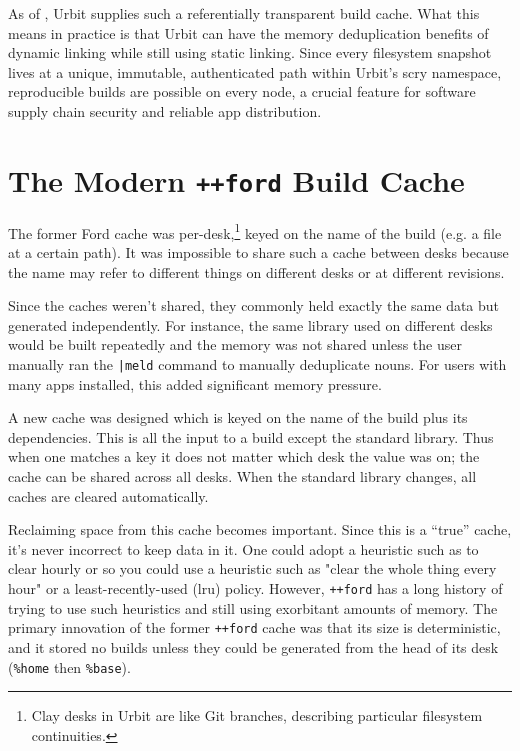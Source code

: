 \documentclass[twoside]{article}
\begin{document}
As of , Urbit supplies such a referentially transparent build cache.  What this means in practice is that Urbit can have the memory deduplication benefits of dynamic linking while still using static linking.  Since every filesystem snapshot lives at a unique, immutable, authenticated path within Urbit's scry namespace, reproducible builds are possible on every node, a crucial feature for software supply chain security and reliable app distribution.

\section{The Modern \lstinline[style=inlinecode]{++ford} Build Cache}

\sloppy
The former Ford cache was per-desk,\footnote{Clay desks in Urbit are like Git branches, describing particular filesystem continuities.} keyed on the name of the build (e.g. a file at a certain path).  It was impossible to share such a cache between desks because the name may refer to different things on different desks or at different revisions.

Since the caches weren't shared, they commonly held exactly the same data but generated independently.  For instance, the same library used on different desks would be built repeatedly and the memory was not shared unless the user manually ran the \lstinline[style=inlinecode]{|meld} command to manually deduplicate nouns.  For users with many apps installed, this added significant memory pressure.

A new cache was designed which is keyed on the name of the build plus its dependencies. This is all the input to a build except the standard library.  Thus when one matches a key it does not matter which desk the value was on; the cache can be shared across all desks.  When the standard library changes, all caches are cleared automatically.

Reclaiming space from this cache becomes important.  Since this is a “true” cache, it's never incorrect to keep data in it.  One could adopt a heuristic such as to clear hourly or so you could use a heuristic such as "clear the whole thing every hour" or a least-recently-used ({\sc lru}) policy.  However, \lstinline[style=inlinecode]{++ford} has a long history of trying to use such heuristics and still using exorbitant amounts of memory.  The primary innovation of the former \lstinline[style=inlinecode]{++ford} cache was that its size is deterministic, and it stored no builds unless they could be generated from the head of its desk (\lstinline[style=inlinecode]{%home} then \lstinline[style=inlinecode]{%base}).
\end{document}
